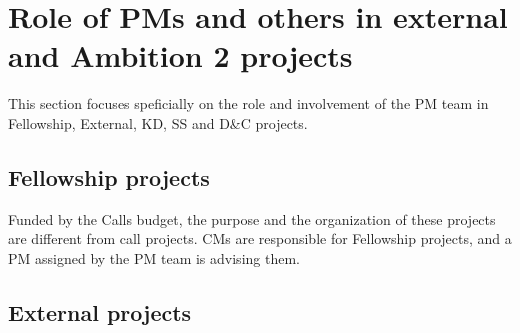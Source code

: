 \section{Role of PMs and others in external and Ambition 2 projects}
\label{app:role-pm}

This section focuses speficially on the role and involvement of the PM team in Fellowship,
External, KD, SS and D\&C projects.


\subsection{Fellowship projects}
Funded by the Calls budget, the purpose and the organization of these projects are different from call projects. CMs are
responsible for Fellowship projects, and a PM assigned by the PM team is advising them.

\subsection{External projects}

